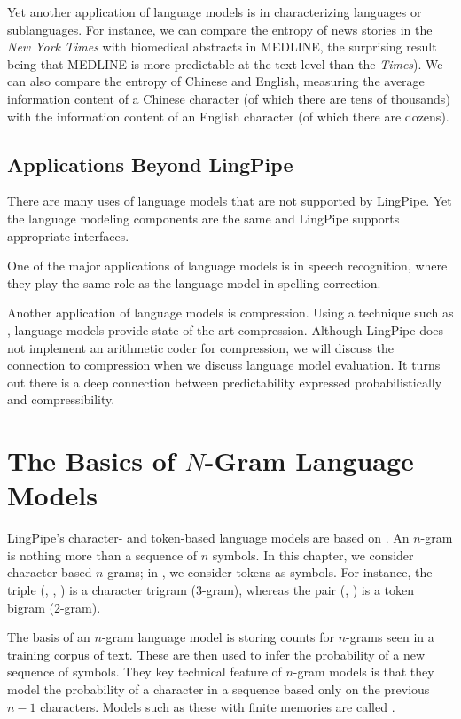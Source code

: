 Yet another application of language models is in characterizing
languages or sublanguages.  For instance, we can compare the entropy
of news stories in the {\it New York Times} with biomedical abstracts
in MEDLINE, the surprising result being that MEDLINE is more
predictable at the text level than the {\it Times}).  We can also
compare the entropy of Chinese and English, measuring the average
information content of a Chinese character (of which there are tens of
thousands) with the information content of an English character (of
which there are dozens).

\subsection{Applications Beyond LingPipe}

There are many uses of language models that are not supported
by LingPipe.  Yet the language modeling components are the same
and LingPipe supports appropriate interfaces.  

One of the major applications of language models is in speech
recognition, where they play the same role as the language model in
spelling correction.

Another application of language models is compression.  Using a
technique such as , language models provide
state-of-the-art compression.  Although LingPipe does not implement an
arithmetic coder for compression, we will discuss the connection to
compression when we discuss language model evaluation.  It turns
out there is a deep connection between predictability expressed
probabilistically and compressibility.


\section{The Basics of $N$-Gram Language Models}

LingPipe's character- and token-based language models are based on
.  An $n$-gram is nothing more than a sequence of
$n$ symbols.  In this chapter, we consider character-based $n$-grams;
in , we consider tokens as symbols.  For instance,
the triple (, , ) is a
character trigram (3-gram), whereas the pair (,
) is a token bigram (2-gram).

The basis of an $n$-gram language model is storing counts for
$n$-grams seen in a training corpus of text.  These are then used to
infer the probability of a new sequence of symbols.  They key
technical feature of $n$-gram models is that they model the
probability of a character in a sequence based only on the previous
$n-1$ characters.  Models such as these with finite memories are
called .

